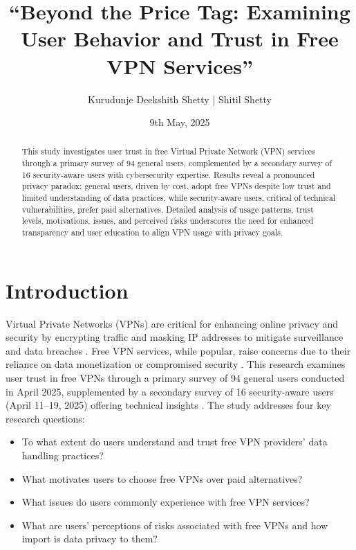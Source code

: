 \documentclass[11pt,a4paper]{article}
\begin{document}
\title{\textcolor{primary}{\textbf{“Beyond the Price Tag: Examining User Behavior and Trust in Free VPN Services”}}}
\author{Kurudunje Deekshith Shetty | Shitil Shetty}
\date{9th May, 2025}
\maketitle

\begin{abstract}
This study investigates user trust in free Virtual Private Network (VPN) services through a primary survey of 94 general users, complemented by a secondary survey of 16 security-aware users with cybersecurity expertise. Results reveal a pronounced privacy paradox: general users, driven by cost, adopt free VPNs despite low trust and limited understanding of data practices, while security-aware users, critical of technical vulnerabilities, prefer paid alternatives. Detailed analysis of usage patterns, trust levels, motivations, issues, and perceived risks underscores the need for enhanced transparency and user education to align VPN usage with privacy goals.
\end{abstract}

\section{Introduction}
Virtual Private Networks (VPNs) are critical for enhancing online privacy and security by encrypting traffic and masking IP addresses to mitigate surveillance and data breaches \citep{Mehrnezhad2022, Alshalan2016}. Free VPN services, while popular, raise concerns due to their reliance on data monetization or compromised security \citep{Ikram2016, Khan2018}. This research examines user trust in free VPNs through a primary survey of 94 general users conducted in April 2025, supplemented by a secondary survey of 16 security-aware users (April 11--19, 2025) offering technical insights \citep{Shetty2025}. The study addresses four key research questions:

\begin{itemize}
   
    \item To what extent do users understand and trust free VPN providers' data handling practices?
    \item What motivates users to choose free VPNs over paid alternatives?
    \item What issues do users commonly experience with free VPN services?
    \item What are users' perceptions of risks associated with free VPNs and how import is data privacy to them?
\end{itemize}
\end{document}

